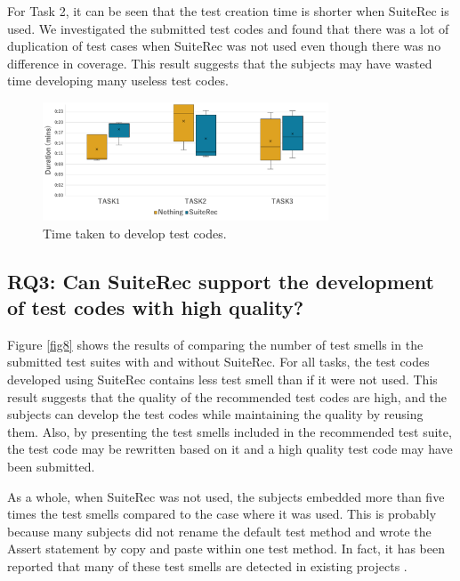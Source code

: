 \documentclass[conference]{IEEEtran}
\begin{document}
For Task 2, it can be seen that the test creation time is shorter when SuiteRec is used. We investigated the submitted test codes and found that there was a lot of duplication of test cases when SuiteRec was not used even though there was no difference in coverage. This result suggests that the subjects may have wasted time developing many useless test codes.

\begin{figure}[htbp]
\centerline{\includegraphics[width=8.5cm]{duration.pdf}}
\caption{Time taken to develop test codes.}
\label{fig7}
\end{figure}

\subsection{RQ3: Can SuiteRec support the development of test codes with high quality?}
Figure \ref{fig8} shows the results of comparing the number of test smells in the submitted test suites with and without SuiteRec. For all tasks, the test codes developed using SuiteRec contains less test smell than if it were not used. This result suggests that the quality of the recommended test codes are high, and the subjects can develop the test codes while maintaining the quality by reusing them. Also, by presenting the test smells included in the recommended test suite, the test code may be rewritten based on it and a high quality test code may have been submitted. %


As a whole, when SuiteRec was not used, the subjects embedded more than five times the test smells compared to the case where it was used. This is probably because many subjects did not rename the default test method and wrote the Assert statement by copy and paste within one test method. In fact, it has been reported that many of these test smells are detected in existing projects \cite{b9}.
\end{document}
